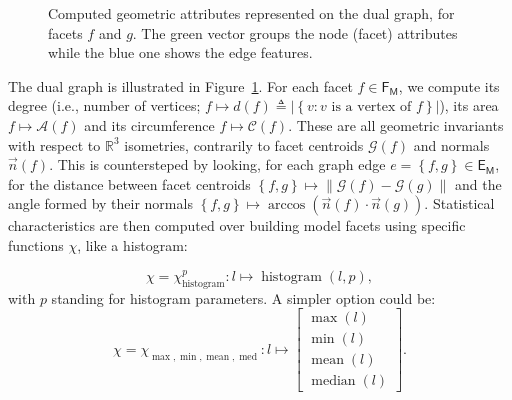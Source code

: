         \begin{figure}[htb]
            \centering
            
            \caption[
                Computed geometric attributes represented on the dual graph, for facets \(f\) and \(g\).
            ]{
                \label{fig::geometric_baseline_features}
                Computed geometric attributes represented on the dual graph, for facets \(f\) and \(g\).
                The green vector groups the node (facet) attributes while the blue one shows the edge features.
            }
        \end{figure}

        The dual graph is illustrated in Figure~\ref{fig::geometric_baseline_features}.
        For each facet $f \in \mathsf{F_M}$, we compute its degree (i.e., number of vertices; $f \mapsto d\left(f\right) \triangleq \left\lvert\left\{v : v\text{ is a vertex of }f\right\}\right\rvert$), its area $f \mapsto \mathscr{A}\left(f\right)$ and its circumference $f \mapsto \mathscr{C}\left(f\right)$.
        These are all geometric invariants with respect to $\mathbb{R}^3$ isometries, contrarily to facet centroids $\mathscr{G}\left(f\right)$ and normals $\vec{n}\left(f\right)$.
        This is countersteped by looking, for each graph edge $e=\left\{f, g\right\} \in \mathsf{E_M}$, for the distance between facet centroids $\left\{f, g\right\} \mapsto \left\lVert \mathscr{G}\left(f\right) - \mathscr{G}\left(g\right) \right\rVert$ and the angle formed by their normals $\left\{f, g\right\} \mapsto \arccos\left(\vec{n}\left(f\right) \cdot \vec{n}\left(g\right)\right)$.
        Statistical characteristics are then computed over building model facets using specific functions \(\chi\), like a histogram:        

        \begin{equation}
            \label{eq::histogram_extractor}
        	\chi = \chi^p_{\operatorname{histogram}}: l \mapsto \operatorname{histogram}(l, p),
        \end{equation}
        with $p$ standing for histogram parameters. A simpler option could be:
        \begin{equation}
            \label{eq::max_min_mean_med_extractor}
            \chi = \chi_{\max,\min,\operatorname{mean},\operatorname{med}}: l \mapsto \begin{bmatrix}
                \max(l)\\
                \min(l)\\
                \operatorname{mean}(l)\\
                \operatorname{median}(l)
            \end{bmatrix}.
        \end{equation}

